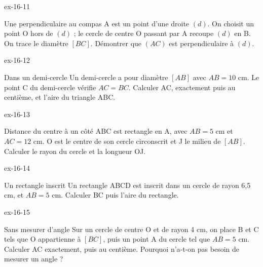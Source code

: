 \begin{blocLivre}{ex-16-11}\begin{exercice}[3]{Une perpendiculaire au compas}
A est un point d’une droite $(d)$. On choisit un point O hors de $(d)$ ; le cercle de centre O passant par A recoupe $(d)$ en B. On trace le diamètre $[BC]$. Démontrer que $(AC)$ est perpendiculaire à $(d)$.
\label{fig-ex-16-11}
\end{exercice}\end{blocLivre}
\begin{blocLivre}{ex-16-12}\begin{exercice}[3]{Dans un demi-cercle}
Un demi-cercle a pour diamètre $[AB]$ avec $AB=10$ cm. Le point C du demi-cercle vérifie $AC=BC$. Calculer AC, exactement puis au centième, et l’aire du triangle ABC.
\label{fig-ex-16-12}
\end{exercice}\end{blocLivre}
\begin{blocLivre}{ex-16-13}\begin{exercice}[3]{Distance du centre à un côté}
ABC est rectangle en A, avec $AB=5$ cm et $AC=12$ cm. O est le centre de son cercle circonscrit et J le milieu de $[AB]$. Calculer le rayon du cercle et la longueur OJ.
\label{fig-ex-16-13}
\end{exercice}\end{blocLivre}
\begin{blocLivre}{ex-16-14}\begin{exercice}[3]{Un rectangle inscrit}
Un rectangle ABCD est inscrit dans un cercle de rayon 6,5 cm, et $AB=5$ cm. Calculer BC puis l’aire du rectangle.
\label{fig-ex-16-14}
\end{exercice}\end{blocLivre}
\begin{blocLivre}{ex-16-15}\begin{exercice}[3]{Sans mesurer d’angle}
Sur un cercle de centre O et de rayon 4 cm, on place B et C tels que O appartienne à $[BC]$, puis un point A du cercle tel que $AB=5$ cm. Calculer AC exactement, puis au centième. Pourquoi n’a-t-on pas besoin de mesurer un angle ?
\label{fig-ex-16-15}
\end{exercice}\end{blocLivre}

\clearpage

